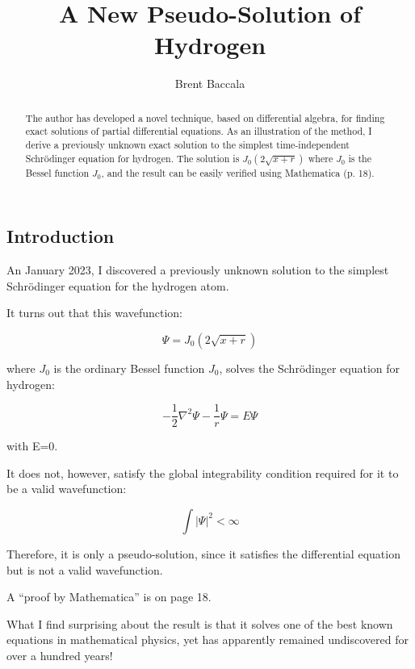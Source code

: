 \documentclass{article}
\title{A New Pseudo-Solution of Hydrogen}
\author{Brent Baccala}
\begin{document}
\parindent 0pt

\maketitle

\begin{abstract}
The author has developed a novel technique, based on differential algebra,
for finding exact solutions of partial
differential equations.  As an illustration of the method,
I derive a previously unknown exact solution to the simplest time-independent Schr\"odinger equation for hydrogen.
The solution is $J_0(2\sqrt{x+r})$ where $J_0$ is the Bessel function $J_0$, and
the result can be easily verified using Mathematica (p. 18).
\end{abstract}

\parskip 12pt

\subsection*{Introduction}

An January 2023, I discovered a previously unknown solution to the simplest Schrödinger equation for the hydrogen atom.

It turns out that this wavefunction:

\begin{equation}
\Psi = J_0(2\sqrt{x+r})
\end{equation}

where $J_0$ is the ordinary Bessel function $J_0$, solves the Schrödinger equation for hydrogen:

\begin{equation}
-\frac{1}{2}\nabla^2 \Psi - \frac{1}{r}\Psi = E \Psi
\end{equation}

with E=0.

It does not, however, satisfy the global integrability condition required for it to be a valid wavefunction:

\begin{equation}
\int|\Psi|^2 < \infty
\end{equation}

Therefore, it is only a pseudo-solution, since it satisfies the differential equation but is not a valid wavefunction.

A ``proof by Mathematica'' is on page 18.

What I find surprising about the result is that it solves one of the best known equations in mathematical physics, yet has apparently remained undiscovered for over a hundred years!
\end{document}
